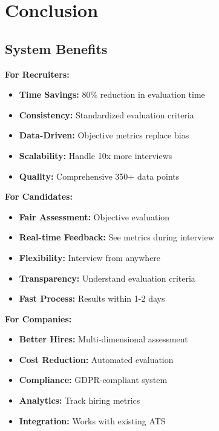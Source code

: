 \documentclass[12pt,a4paper]{article}
\begin{document}
\section{Conclusion}

\subsection{System Benefits}

\begin{tcolorbox}[colback=successgreen!5,colframe=successgreen,title=\textbf{Key Benefits}]

\textbf{For Recruiters:}
\begin{itemize}
    \item \textbf{Time Savings:} 80\% reduction in evaluation time
    \item \textbf{Consistency:} Standardized evaluation criteria
    \item \textbf{Data-Driven:} Objective metrics replace bias
    \item \textbf{Scalability:} Handle 10x more interviews
    \item \textbf{Quality:} Comprehensive 350+ data points
\end{itemize}

\textbf{For Candidates:}
\begin{itemize}
    \item \textbf{Fair Assessment:} Objective evaluation
    \item \textbf{Real-time Feedback:} See metrics during interview
    \item \textbf{Flexibility:} Interview from anywhere
    \item \textbf{Transparency:} Understand evaluation criteria
    \item \textbf{Fast Process:} Results within 1-2 days
\end{itemize}

\textbf{For Companies:}
\begin{itemize}
    \item \textbf{Better Hires:} Multi-dimensional assessment
    \item \textbf{Cost Reduction:} Automated evaluation
    \item \textbf{Compliance:} GDPR-compliant system
    \item \textbf{Analytics:} Track hiring metrics
    \item \textbf{Integration:} Works with existing ATS
\end{itemize}

\end{tcolorbox}
\end{document}
